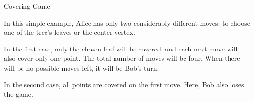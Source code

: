 \begin{problem}{Covering Game}
\Example

\begin{examplethree}
%
\end{examplethree}

\Explanation

In this simple example, Alice has only two considerably different moves:
to choose one of the tree's leaves or the center vertex.

In the first case, only the chosen leaf will be covered, and each next move
will also cover only one point.
The total number of moves will be four.
When there will be no possible moves left, it will be Bob's turn.

In the second case, all points are covered on the first move.
Here, Bob also loses the game.

\end{problem}
